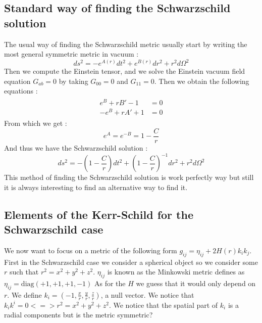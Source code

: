 \documentclass[a4paper,12pt]{article}
\theoremstyle{definition}
\begin{document}
\subsection{Standard way of finding the Schwarzschild solution}
The usual way of finding the Schwarzschild metric usually start by writing the most general symmetric metric in vacuum :
\begin{equation}
	ds^2=-e^{A(r)}dt^2+e^{B(r)}dr^2+r^2d\Omega^2
\end{equation}
Then we compute the Einstein tensor, and we solve the Einstein vacuum field equation $G_{ab}=0$ by taking $G_{00}=0$ and $G_{11}=0$. Then we obtain the following equations :
\begin{align}
\begin{split}
	e^B+rB'-1&=0\\
	-e^B+rA'+1&=0
\end{split}
\end{align}
From which we get :
\begin{equation}
	e^A=e^{-B}=1-\frac{C}{r}
\end{equation}
And thus we have the Schwarzschild solution :
\begin{equation}
	ds^2=-(1-\frac{C}{r})dt^2+(1-\frac{C}{r})^{-1}dr^2+r^2d\Omega^2
\end{equation}
This method of finding the Schwarzschild solution is work perfectly way but still it is always interesting to find an alternative way to find it.
\subsection{Elements of the Kerr-Schild for the Schwarzschild case}
We now want to focus on a metric of the following form $g_{ij}=\eta_{ij}+2H(r)k_ik_j$.
First in the Schwarzschild case we consider a spherical object so we consider some $r$ such that $r^2=x^2+y^2+z^2$.
$\eta_{ij}$ is known as the Minkowski metric defines as $\eta_{ij}=\text{diag}(+1,+1,+1,-1)$
As for the $H$ we guess that it would only depend on $r$.
We define $k_i=(-1,\frac{x}{r},\frac{y}{r},\frac{z}{r})$, a null vector.
We notice that $k_ik^i=0 <=> r^2=x^2+y^2+z^2$.
We notice that the spatial part of $k_i$ is a radial components but is the metric symmetric?
\end{document}
